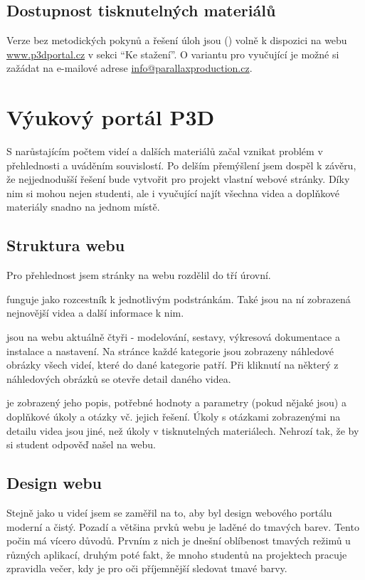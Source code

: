 \subsection{Dostupnost tisknutelných materiálů}
Verze bez metodických pokynů a řešení úloh jsou (\fxnote[inline=true]{\textcolor{red}{BUDOU}}) volně k dispozici na webu \href{https://www.p3dportal.cz}{www.p3dportal.cz} v sekci \enquote{Ke stažení}.
O variantu pro vyučující je možné si zažádat na e-mailové adrese \href{mailto:info@parallaxproduction.cz}{info@parallaxproduction.cz}.

\section{Výukový portál P3D}
S narůstajícím počtem videí a dalších materiálů začal vznikat problém v přehlednosti a uváděním souvislostí.
Po delším přemýšlení jsem dospěl k závěru, že nejjednodušší řešení bude vytvořit pro projekt vlastní webové stránky.
Díky nim si mohou nejen studenti, ale i vyučující najít všechna videa a doplňkové materiály snadno na jednom místě.

\subsection{Struktura webu}
Pro přehlednost jsem stránky na webu rozdělil do tří úrovní.

\noindent{} funguje jako rozcestník k jednotlivým podstránkám. Také jsou na ní zobrazená nejnovější videa a další informace k nim.

\noindent{} jsou na webu aktuálně čtyři - modelování, sestavy, výkresová dokumentace a instalace a nastavení. Na stránce každé kategorie jsou zobrazeny náhledové obrázky všech videí, které do dané kategorie patří.
Při kliknutí na některý z náhledových obrázků se otevře detail daného videa.

\noindent{} je zobrazený jeho popis, potřebné hodnoty a parametry (pokud nějaké jsou) a doplňkové úkoly a otázky vč. jejich řešení. Úkoly s otázkami zobrazenými na detailu videa jsou jiné, než úkoly v tisknutelných materiálech. Nehrozí tak, že by si student odpověď našel na webu. 

\fxnote[inline=true]{\textcolor{mygreen}{Sem přijdou nasypat screeny z webu}}

\subsection{Design webu}
Stejně jako u videí jsem se zaměřil na to, aby byl design webového portálu moderní a čistý.
Pozadí a většina prvků webu je laděné do tmavých barev.
Tento počin má vícero důvodů. 
Prvním z nich je dnešní oblíbenost tmavých režimů u různých aplikací, druhým poté fakt, že mnoho studentů na projektech pracuje zpravidla večer, kdy je pro oči příjemnější sledovat tmavé barvy. \fxnote[inline=true]{\textcolor{mygreen}{Ještě bych tuto větu přeformuloval?}}

